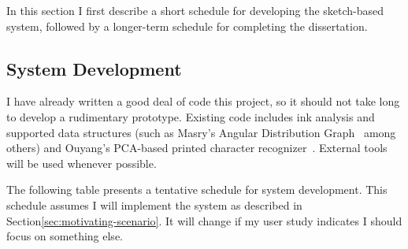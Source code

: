 \documentclass[11pt]{article}
\begin{document}
In this section I first describe a short schedule for developing the
sketch-based system, followed by a longer-term schedule for completing
the dissertation. 

\subsection{System Development}
\label{sec:system-development-schedule}

I have already written a good deal of code this project, so it should
not take long to develop a rudimentary prototype. Existing code
includes ink analysis and supported data structures (such as Masry's
Angular Distribution Graph~\cite{masry-3d-sketch} among others) and
Ouyang's PCA-based printed character
recognizer~\cite{ouyang-visual-recog}. External tools will be used
whenever possible.

The following table presents a tentative schedule for system
development. This schedule assumes I will implement the system as
described in Section\ref{sec:motivating-scenario}. It will change if
my user study indicates I should focus on something else.
\end{document}
